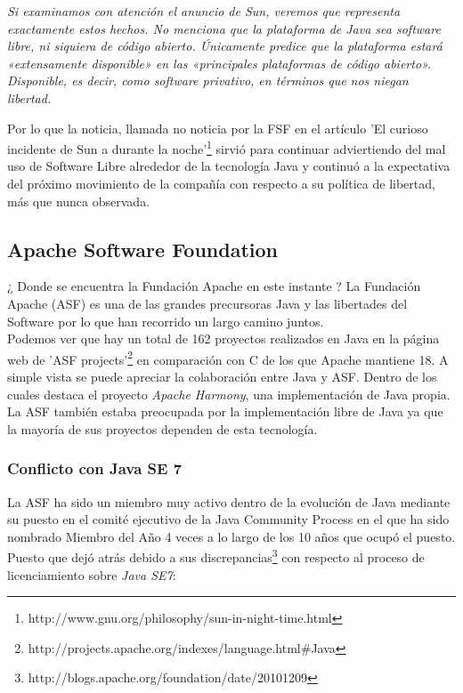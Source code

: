 \documentclass[11pt]{scrartcl}
\begin{document}
    \emph{Si examinamos con atención el anuncio de Sun, veremos que representa exactamente estos hechos. No menciona que la plataforma de Java sea software libre, ni siquiera de código abierto. Únicamente predice que la plataforma estará «extensamente disponible» en las «principales plataformas de código abierto». Disponible, es decir, como software privativo, en términos que nos niegan libertad.}

Por lo que la noticia, llamada no noticia por la FSF en el artículo 'El curioso incidente de Sun a durante la noche'\footnote{http://www.gnu.org/philosophy/sun-in-night-time.html} sirvió para continuar adviertiendo del mal uso de Software Libre alrededor de la tecnología Java y continuó a la expectativa del próximo movimiento de la compañía con respecto a su política de libertad, más que nunca observada.

\subsection{Apache Software Foundation}

¿ Donde se encuentra la Fundación Apache en este instante ? La Fundación Apache (ASF) es una de las grandes precursoras Java y las libertades del Software por lo que han recorrido un largo camino juntos.\\
Podemos ver que hay un total de 162 proyectos realizados en Java en la página web de 'ASF projects'\footnote{http://projects.apache.org/indexes/language.html\#Java} en comparación con C de los que Apache mantiene 18. A simple vista se puede apreciar la colaboración entre Java y ASF. Dentro de los cuales destaca el proyecto \emph{Apache Harmony}, una implementación de Java propia. La ASF también estaba preocupada por la implementación libre de Java ya que la mayoría de sus proyectos dependen de esta tecnología.

\subsubsection{Conflicto con Java SE 7}

La ASF ha sido un miembro muy activo dentro de la evolución de Java mediante su puesto en el comité ejecutivo de la Java Community Process en el que ha sido nombrado Miembro del Año 4 veces a lo largo de los 10 años que ocupó el puesto. Puesto que dejó atrás debido a sus discrepancias\footnote{http://blogs.apache.org/foundation/date/20101209} con respecto al proceso de licenciamiento sobre \emph{Java SE7}:\\
\end{document}
